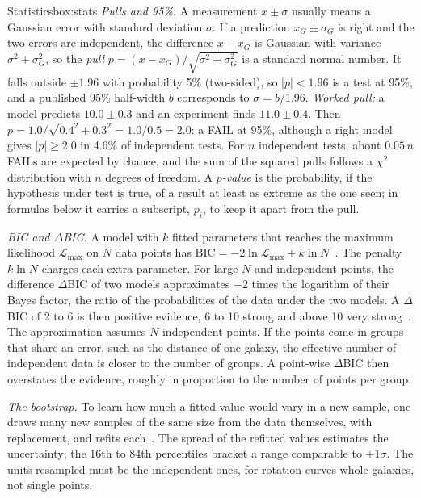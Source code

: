 \begin{primer}{Statistics}{box:stats}
\setlength{\parskip}{3pt plus 1pt}%
\emph{Pulls and 95\%.} A measurement $x\pm\sigma$ usually means a Gaussian error with standard deviation $\sigma$. If a prediction
$x_G\pm\sigma_G$ is right and the two errors are independent, the difference $x-x_G$ is Gaussian with variance $\sigma^2+\sigma_G^2$, so the
\emph{pull} $p=(x-x_G)/\sqrt{\sigma^2+\sigma_G^2}$ is a standard normal number. It falls outside $\pm1.96$ with probability 5\% (two-sided),
so $|p|<1.96$ is a test at 95\%, and a published 95\% half-width $b$ corresponds to $\sigma=b/1.96$. \emph{Worked pull:} a model predicts
$10.0\pm0.3$ and an experiment finds $11.0\pm0.4$. Then $p=1.0/\sqrt{0.4^2+0.3^2}=1.0/0.5=2.0$: a FAIL at 95\%, although a right model
gives $|p|\ge2.0$ in 4.6\% of independent tests. For $n$ independent tests, about $0.05\,n$ FAILs are expected by chance, and the sum of the
squared pulls follows a $\chi^2$ distribution with $n$ degrees of freedom. A \emph{$p$-value} is the probability, if the hypothesis under
test is true, of a result at least as extreme as the one seen; in formulas below it carries a subscript, $p_i$, to keep it apart from
the pull.

\emph{BIC and $\Delta$BIC.} A model with $k$ fitted parameters that reaches the maximum likelihood $\mathcal L_{\max}$ on $N$ data points has
$\mathrm{BIC}=-2\ln\mathcal L_{\max}+k\ln N$~\cite{schwarz1978}. The penalty $k\ln N$ charges each extra parameter. For large $N$ and
independent points, the difference $\Delta$BIC of two models approximates $-2$ times the logarithm of their Bayes factor, the ratio of the
probabilities of the data under the two models. A $\Delta$BIC of 2 to 6 is then positive evidence, 6 to 10 strong and above 10 very
strong~\cite{kassraftery1995}. The approximation assumes $N$ independent points. If the points come in groups that share an error, such
as the distance of one galaxy, the effective number of independent data is closer to the number of groups. A point-wise $\Delta$BIC then
overstates the evidence, roughly in proportion to the number of points per group.

\emph{The bootstrap.} To learn how much a fitted value would vary in a new sample, one draws many new samples of the same size from the
data themselves, with replacement, and refits each~\cite{efron1979}. The spread of the refitted values estimates the uncertainty; the 16th
to 84th percentiles bracket a range comparable to $\pm1\sigma$. The units resampled must be the independent ones, for rotation curves whole
galaxies, not single points.


\end{primer}
